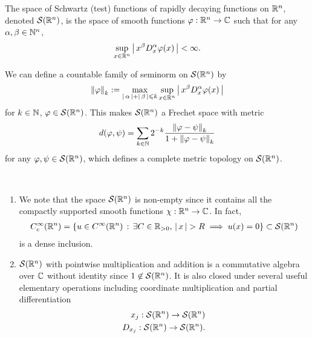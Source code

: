 \documentclass[12pt]{article}
\begin{document}
\begin{fdefinition}
    The space of Schwartz (test) functions of rapidly decaying functions on $\R^n$, denoted $\sch(\R^n)$, is the space of smooth functions $\varphi : \R^n \to \C$ such that for any $\alpha, \beta \in \N^n$, 
    \begin{align}
    \sup_{x \in \R^n} \abs{x^\beta D^\alpha_x \varphi(x)} < \infty. 
    \end{align}

    
    We can define a countable family of seminorm on $\sch(\R^n)$ by 
    \begin{align}
    \norm[\varphi]_k := \max_{\abs{\alpha} + \abs{\beta} \leq k} \sup_{x \in \R^n} \abs{x^\beta D^\alpha_x \varphi(x)}
    \end{align}
    for $k \in \N$, $\varphi \in \sch(\R^n)$. This makes $\sch(\R^n)$ a Frechet space with metric 
    \begin{align*}
    d(\varphi, \psi) = \sum_{k \in \N} 2^{-k} \frac{\norm[\varphi - \psi]_k}{1 + \norm[\varphi - \psi]_k} 
    \end{align*}
    for any $\varphi, \psi \in \sch(\R^n)$, which defines a complete metric topology on $\sch(\R^n)$. 
\end{fdefinition}
\begin{rem} \hfill \\
    \begin{enumerate}
        \item     We note that the space $\sch(\R^n)$ is non-empty since it contains all the compactly supported smooth functions $\chi : \R^n \to \C$. In fact, 
        \begin{align*}
        C^\infty_c(\R^n) = \set{u \in C^\infty(\R^n) \wh \exists C \in \R_{> 0}, \, \abs{x} > R \implies u(x) = 0} \subset \sch(\R^n)
        \end{align*}
        is a dense inclusion. 
        
        \item $\sch(\R^n)$ with pointwise multiplication and addition is a commutative algebra over $\C$ without identity since $1 \not\in \sch(\R^n)$. It is also closed under several useful elementary operations including coordinate multiplication and partial differentiation
        \begin{align*}
        x_j : \sch(\R^n) \to \sch(\R^n) \\
        D_{x_j} : \sch(\R^n) \to \sch(\R^n). 
        \end{align*}
        
    \end{enumerate}
\end{rem}
\end{document}
